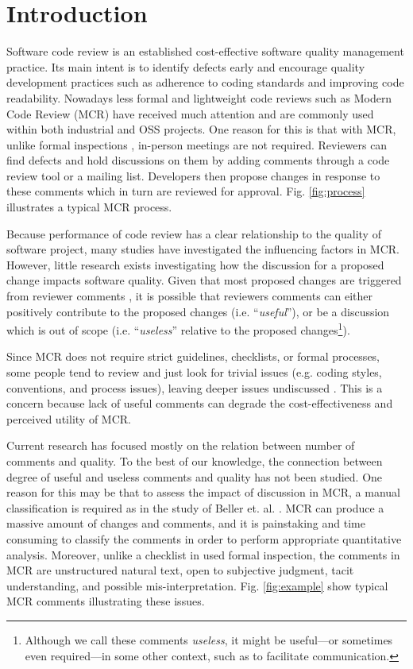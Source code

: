 
\section{Introduction}
Software code review is an established cost-effective software quality management practice.
Its main intent is to  identify  defects early and encourage quality development practices such as adherence to coding standards and improving code readability.
Nowadays less formal and lightweight code reviews such as Modern Code Review (MCR)\cite{Bacchelli2013a} have received much attention and are commonly used within both industrial and OSS projects.
One reason for this is that with MCR, unlike formal inspections \cite{Fagan:1976:DCI:1661010.1661012}, in-person meetings are not required.
Reviewers can find defects and hold discussions on them by adding comments through a code review tool or a mailing list.
Developers then propose changes in response to these comments which in turn are reviewed for approval.  Fig. \ref{fig:process} illustrates a typical MCR process. 

Because performance of code review has a clear relationship to the quality of software project, many studies have investigated the influencing factors in MCR\cite{Baysal2001,Mcintosh,Beller,Hamasaki2013}.
However, little research exists investigating how the discussion for a proposed change impacts software quality.
Given that most proposed changes are triggered from reviewer comments \cite{Beller}, 
it is possible that reviewers comments can either positively contribute to the proposed changes (i.e. ``\emph{useful}''), or be a discussion which is out of scope (i.e. ``\emph{useless}'' relative to the proposed changes\footnote{Although we call these comments \emph{useless}, it might be useful---or sometimes even required---in some other context, such as to facilitate communication.}).

Since MCR does not require strict guidelines, checklists, or formal processes, some people tend to review and just look for trivial issues (e.g. coding styles, conventions, and process issues), leaving deeper issues undiscussed \cite{Mcintosh}.
This is a concern because lack of useful comments can degrade the cost-effectiveness and perceived utility of MCR.

Current research has focused mostly on the relation between number of comments and quality.
To the best of our knowledge, the connection between degree of useful and useless comments and quality has not been studied.
One reason for this may be that to assess the impact of discussion in MCR, a manual classification is required as in the study of Beller et. al. \cite{Beller}.
MCR can produce a massive amount of changes and comments\cite{Balachandran2013,Thongtanunam2014}, and it is painstaking and time consuming to classify the comments in order to perform appropriate quantitative analysis.
Moreover, unlike a checklist in used formal inspection, the comments in MCR are unstructured natural text, open to subjective judgment, tacit understanding, and possible mis-interpretation.  Fig. \ref{fig:example} show typical MCR comments illustrating these issues.

